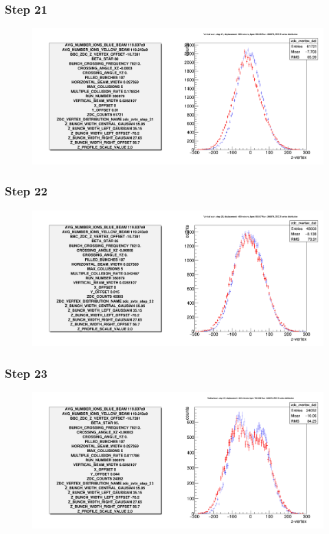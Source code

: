 \begin{frame}
  \frametitle{Step 21}
  \begin{figure}
    \includegraphics[width=\linewidth]{"./figures/tuned_simulation_step_21"}
    \label{fig:step_21}
  \end{figure}
\end{frame}

\begin{frame}
  \frametitle{Step 22}
  \begin{figure}
    \includegraphics[width=\linewidth]{"./figures/tuned_simulation_step_22"}
    \label{fig:step_22}
  \end{figure}
\end{frame}

\begin{frame}
  \frametitle{Step 23}
  \begin{figure}
    \includegraphics[width=\linewidth]{"./figures/tuned_simulation_step_23"}
    \label{fig:step_23}
  \end{figure}
\end{frame}

